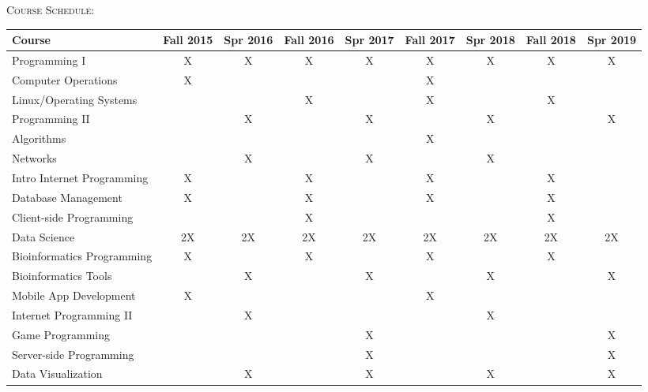 \documentclass[letterpaper,10pt]{article}
\begin{document}
\begin{center}
\end{center}

\bigskip



{\scshape  \Large Course Schedule:}\\[5pt]
\setlength{\extrarowheight}{4pt}
\begin{tabular}{ l | c | c | c |c |c |c |c |c |}
Course & Fall 2015 & Spr 2016 & Fall 2016 & Spr 2017 & Fall 2017 & Spr 2018 & Fall 2018 & Spr 2019\\
\hline
\hline
Programming I             & X & X & X & X & X & X & X & X\\[2pt]
Computer Operations       & X &   &  &  & X &  &  &  \\[2pt]
Linux/Operating Systems   &  &  & X &  & X &  & X &   \\[2pt]
Programming II            &  & X &  & X & & X & & X  \\[2pt]
Algorithms                & &  & & & X &  & &  \\[2pt]
Networks                  & & X & & X & & X & &   \\[2pt]
Intro Internet Programming & X & & X & & X & & X & \\[2pt]
Database Management       & X & & X & & X &  & X &  \\[2pt]
Client-side Programming   & & & X & & & & X &  \\[2pt]
\hline
Data Science              & 2X & 2X & 2X & 2X & 2X & 2X & 2X & 2X\\[2pt]
Bioinformatics Programming  & X & & X & & X & & X & \\[2pt]
Bioinformatics Tools      &  & X &  & X & & X & & X  \\[2pt]
Mobile App Development    & X & &  & & X & &  &  \\[2pt]
Internet Programming II   & & X & &  & & X & &  \\[2pt]
Game Programming          & & &  & X & & &  & X  \\[2pt]
Server-side Programming   & & & & X & & & & X \\[2pt]
Data Visualization        & & X & & X & & X & & X \\[2pt]
\hline
\end{tabular}
\end{document}

